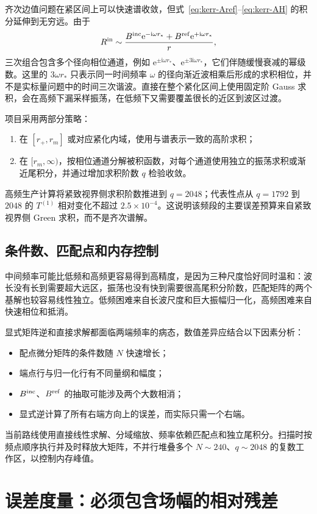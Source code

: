 \documentclass[UTF8,fontset=fandol,11pt,a4paper]{ctexart}
\newcommand{\ii}{\mathrm i}
\newcommand{\ee}{\mathrm e}
\newcommand{\Bin}{B^{\rm inc}}
\newcommand{\Bref}{B^{\rm ref}}
\begin{document}
齐次边值问题在紧区间上可以快速谱收敛，但式~\eqref{eq:kerr-Aref}--\eqref{eq:kerr-AH} 的积分延伸到无穷远。由于
\begin{equation}
R^{\rm in}\sim\frac{\Bin\ee^{-\ii\omega r_*}+\Bref\ee^{+\ii\omega r_*}}{r},
\end{equation}
三次组合包含多个径向相位通道，例如 $\ee^{\pm\ii\omega r_*}$、$\ee^{\pm3\ii\omega r_*}$，它们伴随缓慢衰减的幂级数。这里的 $3\omega r_*$ 只表示同一时间频率 $\omega$ 的径向渐近波相乘后形成的求积相位，并不是实标量问题中的时间三次谐波。直接在整个紧化区间上使用固定阶 Gauss 求积，会在高频下漏采样振荡，在低频下又需要覆盖很长的近区到波区过渡。

项目采用两部分策略：
\begin{enumerate}
\item 在 $[r_+,r_m]$ 或对应紧化内域，使用与谱表示一致的高阶求积；
\item 在 $[r_m,\infty)$，按相位通道分解被积函数，对每个通道使用独立的振荡求积或渐近尾积分，并通过增加求积阶数 $q$ 检验收敛。
\end{enumerate}
高频生产计算将紧致视界侧求积阶数推进到 $q=2048$；代表性点从 $q=1792$ 到 $2048$ 的 $T^{(1)}$ 相对变化不超过 $2.5\times10^{-4}$。这说明该频段的主要误差预算来自紧致视界侧 Green 求积，而不是齐次谱解。

\subsection{条件数、匹配点和内存控制}

中间频率可能比低频和高频更容易得到高精度，是因为三种尺度恰好同时温和：波长没有长到需要超大远区，振荡也没有快到需要很高尾积分阶数，匹配矩阵的两个基解也较容易线性独立。低频困难来自长波尺度和巨大振幅归一化，高频困难来自快速相位和抵消。

显式矩阵逆和直接求解都面临两端频率的病态，数值差异应结合以下因素分析：
\begin{itemize}
\item 配点微分矩阵的条件数随 $N$ 快速增长；
\item 端点行与归一化行有不同量纲和幅度；
\item $\Bin$、$\Bref$ 的抽取可能涉及两个大数相消；
\item 显式逆计算了所有右端方向上的误差，而实际只需一个右端。
\end{itemize}
当前路线使用直接线性求解、分域缩放、频率依赖匹配点和独立尾积分。扫描时按频点顺序执行并及时释放大矩阵，不并行堆叠多个 $N\sim240$、$q\sim2048$ 的复数工作区，以控制内存峰值。

\section{误差度量：必须包含场幅的相对残差}
\label{sec:diagnostics}
\end{document}
